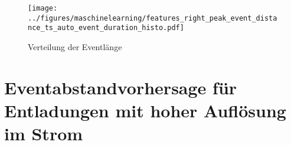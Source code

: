 \begin{figure}[htbp]
    \centering
      \texttt{[image: ../figures/maschinelearning/features\_right\_peak\_event\_distance\_ts\_auto\_event\_duration\_histo.pdf]}
      \caption{Verteilung der Eventlänge}
      \label{fig:1mus-event-duration-box}
\end{figure}






\section{Eventabstandvorhersage für Entladungen mit hoher Auflösung im Strom}

